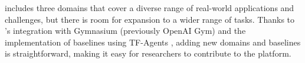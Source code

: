 



\method includes three domains that cover a diverse range of real-world applications and challenges, but there is room for expansion to a wider range of tasks. Thanks to \method's integration with Gymnasium \citep{towers_gymnasium_2023} (previously OpenAI Gym) and the implementation of baselines using TF-Agents \citep{TFAgents}, adding new domains and baselines is straightforward, making it easy for researchers to contribute to the platform.

